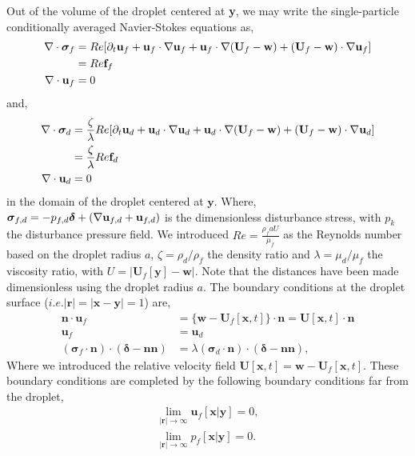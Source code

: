 Out of the volume of the droplet centered at \textbf{y}, we may write the single-particle conditionally averaged Navier-Stokes equations as,  
\begin{align*}
    \mathbf{\nabla}\cdot\bm\sigma_f
    &= 
    Re [
    \partial_t \textbf{u}_f
    + \textbf{u}_f\cdot \mathbf{\nabla} \textbf{u}_f
    + \textbf{u}_f\cdot \mathbf{\nabla} (\textbf{U}_f - \textbf{w})
    + (\textbf{U}_f - \textbf{w})\cdot \mathbf{\nabla} \textbf{u}_f]\\
    &= Re \textbf{f}_f\\
    \mathbf{\nabla}\cdot \textbf{u}_f &= 0
\end{align*}
and, 
\begin{align*}
    \mathbf{\nabla}\cdot\bm\sigma_d
    &= 
    \frac{\zeta}{\lambda}Re [
    \partial_t \textbf{u}_d
    + \textbf{u}_d\cdot \mathbf{\nabla} \textbf{u}_d
    + \textbf{u}_d\cdot \mathbf{\nabla} (\textbf{U}_f - \textbf{w})
    + (\textbf{U}_f - \textbf{w})\cdot \mathbf{\nabla} \textbf{u}_d]\\
    &= \frac{\zeta}{\lambda}Re \textbf{f}_d\\
    \mathbf{\nabla}\cdot \textbf{u}_d &= 0
\end{align*}
in the domain of the droplet centered at $\textbf{y}$. 
Where, $\bm\sigma_{f,d} = -p_{f,d}\bm\delta + (\mathbf{\nabla} \textbf{u}_{f,d} + \textbf{u}_{f,d})$ is the dimensionless disturbance stress, with $p_k$ the disturbance pressure field. 
We introduced $Re = \frac{\rho_f a U}{\mu_f}$ as the Reynolds number based on the droplet radius $a$, $\zeta = \rho_d / \rho_f$ the density ratio and $\lambda = \mu_d / \mu_f$ the viscosity ratio, with $U = |\textbf{U}_f[\textbf{y}] - \textbf{w}|$. 
Note that the distances have been made dimensionless using the droplet radius $a$. 
The boundary conditions at the droplet surface ($i.e. |\textbf{r}| = |\textbf{x} - \textbf{y}| = 1$) are, 
\begin{align}
    \textbf{n}\cdot\textbf{u}_f
    &= \{\textbf{w} - \textbf{U}_f[\textbf{x},t]\}\cdot \textbf{n} 
    = \textbf{U}[\textbf{x},t]\cdot \textbf{n} \\
    \textbf{u}_f &= \textbf{u}_d\\
    (\bm\sigma_f\cdot\textbf{n})\cdot (\bm\delta - \textbf{nn})
    &= \lambda (\bm\sigma_d\cdot \textbf{n})\cdot (\bm\delta - \textbf{nn}),
    \label{eq:bc_stress_orig}
\end{align}
Where we introduced the relative velocity field $\textbf{U}[\textbf{x},t] = \textbf{w} - \textbf{U}_f[\textbf{x},t]$. 
These boundary conditions are completed by the following boundary conditions far from the droplet,
\begin{align*}
    \lim_{|\textbf{r}|\to\infty }\textbf{u}_f[\textbf{x}|\textbf{y}] = 0,\\
    \lim_{|\textbf{r}|\to\infty }p_f[\textbf{x}|\textbf{y}] = 0. 
\end{align*}

